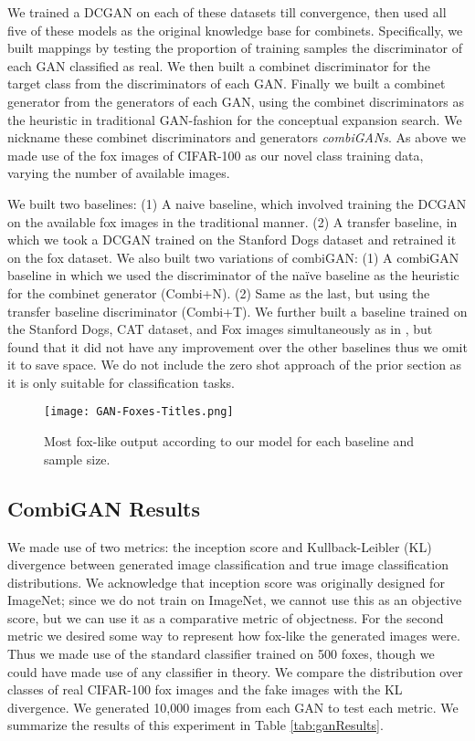 \documentclass[letterpaper]{article}
\begin{document}
We trained a DCGAN on each of these datasets till convergence, then used all five of these models as the original knowledge base for combinets. Specifically, we built mappings by testing the proportion of training samples the discriminator of each GAN classified as real. We then built a combinet discriminator for the target class from the discriminators of each GAN. Finally we built a combinet generator from the generators of each GAN, using the combinet discriminators as the heuristic in traditional GAN-fashion for the conceptual expansion search. We nickname these combinet discriminators and generators {\em combiGANs}. As above we made use of the fox images of CIFAR-100 as our novel class training data, varying the number of available images.

We built two baselines: (1) A naive baseline, which involved training the DCGAN on the available fox images in the traditional manner. (2) A transfer baseline, in which we took a DCGAN trained on the Stanford Dogs dataset and retrained it on the fox dataset. We also built two variations of combiGAN: (1) A combiGAN baseline in which we used the discriminator of the na\"ive baseline as the heuristic for the combinet generator (Combi+N). (2) Same as the last, but using the transfer baseline discriminator (Combi+T). 
We further built a baseline trained on the Stanford Dogs, CAT dataset, and Fox images simultaneously as in \cite{cheongcan}, but found that it did not have any improvement over the other baselines thus we omit it to save space. 
We do not include the zero shot approach of the prior section as it is only suitable for classification tasks.


\begin{figure}[tb]
  \centering
  \texttt{[image: GAN-Foxes-Titles.png]}
  \caption{Most fox-like output according to our model for each baseline and sample size.}
  \label{fig:ganFoxes}
\end{figure}

\subsection{CombiGAN Results}

We made use of two metrics: the inception score \cite{salimans2016improved} and Kullback-Leibler (KL) divergence between generated image classification and true image classification distributions. 
We acknowledge that inception score was originally designed for ImageNet;
since we do not train on ImageNet, we cannot use this as an objective score, but we can use it as a comparative metric of objectness. 
For the second metric we desired some way to represent how fox-like the generated images were. 
Thus we made use of the standard classifier trained on 500 foxes, though we could have made use of any classifier in theory. 
We compare the distribution over classes of real CIFAR-100 fox images and the fake images with the KL divergence. 
We generated 10,000 images from each GAN to test each metric. We summarize the results of this experiment in Table \ref{tab:ganResults}.
\end{document}
